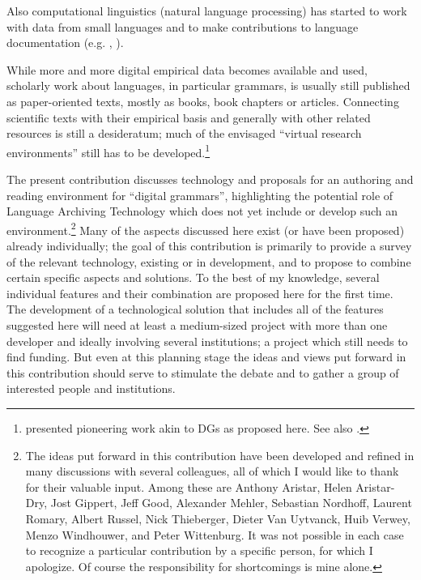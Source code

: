 Also computational linguistics (natural language processing) has started to work with data from small languages and to make contributions to language documentation (e.g. \citet{Bird2009}, \citet{BenderEtAl2010clislt}).

While more and more digital empirical data becomes available and used, scholarly work about languages, in particular grammars, is usually still published as paper-oriented texts, mostly as books, book chapters or articles. Connecting scientific texts with their empirical basis and generally with other related resources is still a desideratum; much of the envisaged ``virtual research environments'' still has to be developed.\footnote{\citet{Thieberger2006} presented pioneering work akin to DGs as proposed here. See also \citet{Thieberger2009}.}

The present contribution discusses technology and proposals for an authoring and reading environment for ``digital grammars'', highlighting the potential role of Language Archiving Technology which does not yet include or develop such an environment.\thanks{The 
 ideas put forward in this contribution have been developed and refined in many discussions with several colleagues, all of which I would like to thank for their valuable input. Among these are Anthony Aristar, Helen Aristar-Dry, Jost Gippert, Jeff Good, Alexander Mehler, Sebastian Nordhoff, Laurent Romary, Albert Russel, Nick Thieberger, Dieter Van Uytvanck, Huib Verwey, Menzo Windhouwer, and Peter Wittenburg. It was not possible in each case to recognize a particular contribution by a specific person, for which I apologize. Of course the responsibility for shortcomings is mine alone.} Many of the aspects discussed here exist (or have been proposed) already individually; the goal of this contribution is primarily to provide a survey of the relevant technology, existing or in development, and to propose to combine certain specific aspects and solutions. To the best of my knowledge, several individual features and their combination are proposed here for the first time. The development of a technological solution that includes all of the features suggested here will need at least a medium-sized project with more than one developer and ideally involving several institutions; a project which still needs to find funding. But even at this planning stage the ideas and views put forward in this contribution should serve to stimulate the debate and to gather a group of interested people and institutions.

